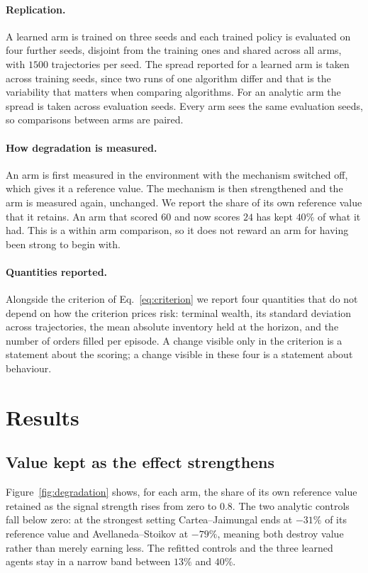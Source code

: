 \documentclass[10pt,twocolumn]{article}
\begin{document}
\paragraph{Replication.}
A learned arm is trained on three seeds and each trained policy is evaluated on four further seeds, disjoint from
the training ones and shared across all arms, with $1500$ trajectories per seed. The spread reported for a learned
arm is taken across training seeds, since two runs of one algorithm differ and that is the variability that
matters when comparing algorithms. For an analytic arm the spread is taken across evaluation seeds. Every arm sees
the same evaluation seeds, so comparisons between arms are paired.

\paragraph{How degradation is measured.}
An arm is first measured in the environment with the mechanism switched off, which gives it a reference value.
The mechanism is then strengthened and the arm is measured again, unchanged. We report the share of its own
reference value that it retains. An arm that scored $60$ and now scores $24$ has kept $40\%$ of what it had. This
is a within arm comparison, so it does not reward an arm for having been strong to begin with.

\paragraph{Quantities reported.}
Alongside the criterion of Eq.~\eqref{eq:criterion} we report four quantities that do not depend on how the
criterion prices risk: terminal wealth, its standard deviation across trajectories, the mean absolute inventory
held at the horizon, and the number of orders filled per episode. A change visible only in the criterion is a
statement about the scoring; a change visible in these four is a statement about behaviour.

\section{Results}

\subsection{Value kept as the effect strengthens}

Figure~\ref{fig:degradation} shows, for each arm, the share of its own reference value retained as the signal
strength rises from zero to $0.8$. The two analytic controls fall below zero: at the strongest setting
Cartea--Jaimungal ends at $-31\%$ of its reference value and Avellaneda--Stoikov at $-79\%$, meaning both destroy
value rather than merely earning less. The refitted controls and the three learned agents stay in a narrow band
between $13\%$ and $40\%$.
\end{document}
